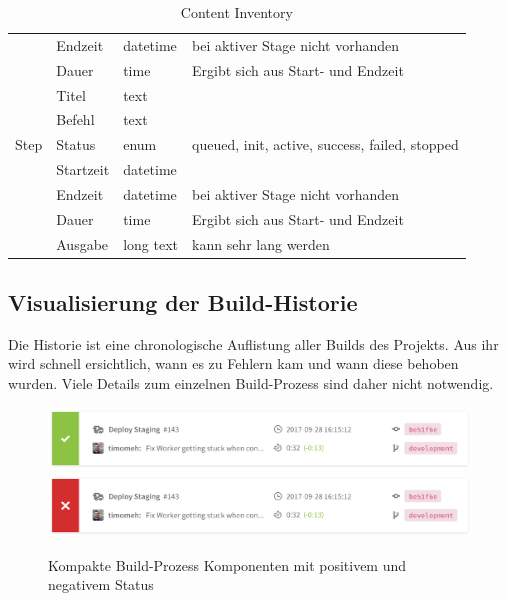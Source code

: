 \begin{table}[H]
\begin{tabularx}{\textwidth}{| l | p{3cm} | l | X |}
      & Endzeit & datetime & bei aktiver Stage nicht vorhanden \\ \cline{2-4}
      & Dauer & time & Ergibt sich aus Start- und Endzeit \\ \hline
    \multirow{5}{*}{Step} & Titel & text &  \\ \cline{2-4}
      & Befehl & text &  \\ \cline{2-4}
      & Status & enum & queued, init, active, success, failed, stopped \\ \cline{2-4}
      & Startzeit & datetime &  \\ \cline{2-4}
      & Endzeit & datetime & bei aktiver Stage nicht vorhanden \\ \cline{2-4}
      & Dauer & time & Ergibt sich aus Start- und Endzeit \\ \cline{2-4}
      & Ausgabe & long text & kann sehr lang werden \\ \hline
  \end{tabularx}
  \caption{Content Inventory}
  \label{tab:content-inventory}
\end{table}

\subsection{Visualisierung der Build-Historie}
\label{subsec:visualisierung-build-history}

Die Historie ist eine chronologische Auflistung aller Builds des Projekts. Aus ihr wird schnell ersichtlich, wann es zu Fehlern kam und wann diese behoben wurden. Viele Details zum einzelnen Build-Prozess sind daher nicht notwendig.

\begin{figure}[h]
  \caption{Kompakte Build-Prozess Komponenten mit positivem und negativem Status}
  \label{fig:build-process-short}
  \centering
    \includegraphics[width=\textwidth]{assets/build-overview-finished}
    \includegraphics[width=\textwidth]{assets/build-overview-failed}
\end{figure}

